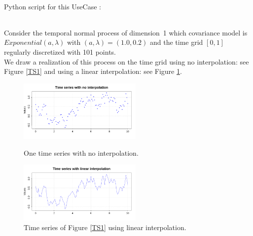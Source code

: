 \textspace\\
Python script for this UseCase :


\textspace\\
Consider the temporal normal process of dimension~1 which covariance model is $Exponential(a,\lambda)$ with $(a, \lambda)=(1.0, 0.2)$ and the  time grid $[0,1]$ regularly discretized with 101 points. \\
We draw  a realization of this process on the time grid using no interpolation: see  Figure \ref{TS1} and using a linear interpolation: see  Figure \ref{TS2}.


\begin{figure}[H]
  \begin{minipage}{9cm}
    \begin{center}
      \includegraphics[width=6cm]{Figures/timeSeriesNoInterp.png}
      \caption{One time series with no interpolation.}
      \label{TS1}
    \end{center}
  \end{minipage}
  \hfill
  \begin{minipage}{9cm}
    \begin{center}
      \includegraphics[width=6cm]{Figures/timeSeriesInterp.png}
      \caption{Time series of Figure \ref{TS1} using linear interpolation.}
      \label{TS2}
    \end{center}
  \end{minipage}
\end{figure}
